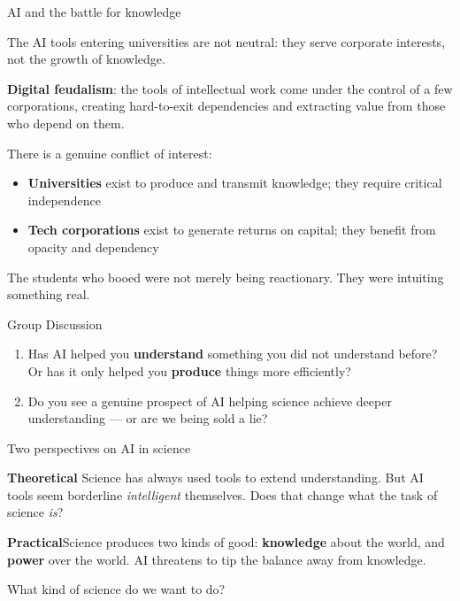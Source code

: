 \documentclass[fleql]{beamer}
\newcommand{\kw}[1]{\textbf{#1}}
\begin{document}
\begin{frame}{AI and the battle for knowledge}

  The AI tools entering universities are not neutral: they serve
  corporate interests, not the growth of knowledge.

  \vspace{0.5em}
  \kw{Digital feudalism}: the tools of intellectual work come
  under the control of a few corporations, creating hard-to-exit
  dependencies and extracting value from those who depend on them.

  \vspace{0.5em}
  There is a genuine conflict of interest:
  \begin{itemize}
  \item \textbf{Universities} exist to produce and transmit
    knowledge; they require critical independence
  \item \textbf{Tech corporations} exist to generate returns
    on capital; they benefit from opacity and dependency
  \end{itemize}

  \vspace{0.3em}
  \small The students who booed were not merely being
  reactionary. They were intuiting something real.

\end{frame}

\begin{frame}{Group Discussion}

  \begin{enumerate}
  \item Has AI helped you \textbf{understand} something you
    did not understand before? Or has it only helped you
    \textbf{produce} things more efficiently?
  \item Do you see a genuine prospect of AI helping science
    achieve deeper understanding --- or are we being sold
    a lie?
  \end{enumerate}

\end{frame}

\begin{frame}{Two perspectives on AI in science}

  \textbf{Theoretical}\enspace
  Science has always used tools to extend understanding.
  But AI tools seem borderline \emph{intelligent} themselves.
  Does that change what the task of science \emph{is}?

  \bigskip

  \textbf{Practical}\enspace Science produces two kinds of good:
  \textbf{knowledge} about the world, and \textbf{power} over the
  world. AI threatens to tip the balance away from knowledge.

  \bigskip What kind of science do we want to do? 

\end{frame}
\end{document}
